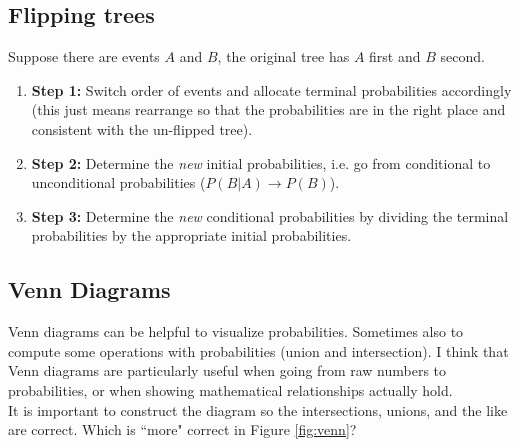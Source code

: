 \documentclass[12pt,twoside]{article}
\numberwithin{equation}{section}
\begin{document}
\begin{enumerate}
	
	\subsection{Flipping trees}
	Suppose there are events $A$ and $B$, the original tree has $A$ first and $B$ second.
	\begin{enumerate}
		\item \textbf{Step 1:} Switch order of events and allocate terminal probabilities accordingly (this just means rearrange so that the probabilities are in the right place and consistent with the un-flipped tree).
		\item \textbf{Step 2:} Determine the \textit{new} initial probabilities, i.e. go from conditional to unconditional probabilities ($P(B|A)\rightarrow P(B)$).
		\item \textbf{Step 3:} Determine the \textit{new} conditional probabilities by dividing the terminal probabilities by the appropriate initial probabilities.
	\end{enumerate}
\end{enumerate}


	\subsection{Venn Diagrams}
	Venn diagrams can be helpful to visualize probabilities. Sometimes also to compute some operations with probabilities (union and intersection). I think that Venn diagrams are particularly useful when going from raw numbers to probabilities, or when showing mathematical relationships actually hold.\\	
	It is important to construct the diagram so the intersections, unions, and the like are correct. Which is ``more" correct in Figure \ref{fig:venn}?
	
\end{document}
